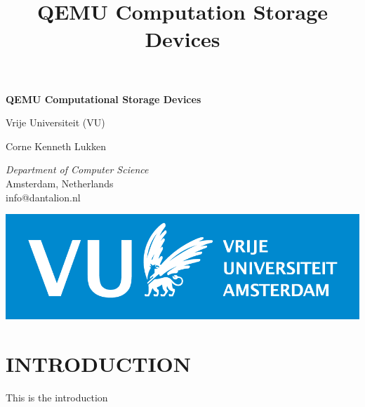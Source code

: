 \documentclass[conference]{IEEEtran}
\title{QEMU Computation Storage Devices%
}
\begin{document}
\begin{titlepage}
\begingroup
\centering
{\LARGE\bfseries QEMU Computational Storage Devices}

\vspace{1cm}

{\Large Vrije Universiteit (VU)}

\vspace{0.5cm}

{Corne Kenneth Lukken}

{\textit{Department of Computer Science} \\
Amsterdam, Netherlands \\
info@dantalion.nl}

\vspace{4.0cm}


\vfill
\endgroup
\hfill
\begin{minipage}{0.3\textwidth}
\begin{flushright}
	\includegraphics[width=\textwidth]{resources/images/vu-logo.png}
\end{flushright}
\end{minipage}
\end{titlepage}

\clearpage
\onecolumn

\hypersetup{
	linkcolor=black
}

\renewcommand{\contentsname}{CONTENTS}
\tableofcontents{}

\hypersetup{
	linkcolor=blue
}

\twocolumn

\section*{INTRODUCTION}
This is the introduction
\end{document}
